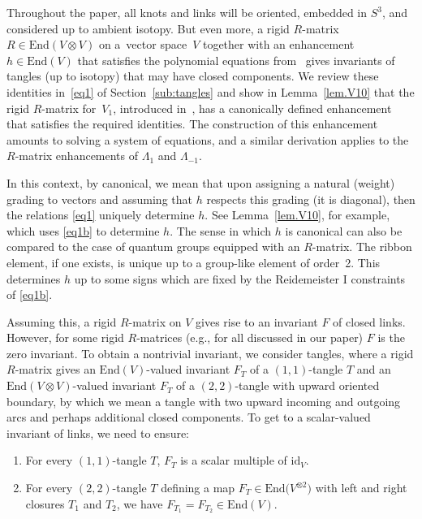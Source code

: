 \documentclass[10pt,a4paper]{amsart}
\makeatletter
\numberwithin{equation}{section}
\theoremstyle{definition}
\def\namedlabel#1#2{\begingroup
 #2%
 \def\@currentlabel{#2}%
 \phantomsection\label{#1}\endgroup
}
\makeatother
\begin{document}
Throughout the paper, all knots and links will be oriented, embedded in $S^3$,
and considered up to ambient isotopy.
But even more, a rigid $R$-matrix $R \in \mathrm{End}(V \otimes V)$ on a~vector space~$V$ together with
an enhancement $h \in \mathrm{End}(V)$ that satisfies the polynomial equations
from~\cite[Theorem~3.7]{Ohtsuki} gives invariants of tangles (up to isotopy)
that may have closed components. We review these identities in~\eqref{eq1} of Section~\ref{sub:tangles} and show in Lemma~\ref{lem.V10} that the rigid $R$-matrix for~$V_1$, introduced in~\cite{GK:multi}, has a canonically defined enhancement that satisfies the
required identities. The construction of this enhancement amounts to solving a system of equations, and a similar derivation applies to the $R$-matrix enhancements of $\Lambda_1$ and $\Lambda_{-1}$.

In this context, by canonical, we mean that upon assigning a natural (weight) grading to vectors and assuming that $h$ respects this grading (it is diagonal), then the relations \eqref{eq1} uniquely determine $h$. See Lemma~\ref{lem.V10}, for example, which uses \eqref{eq1b} to determine $h$. The sense in which $h$ is canonical can also be compared to the case of quantum groups equipped with an $R$-matrix. The ribbon element, if one exists, is unique up to a group-like element of order~2. This determines $h$ up to some signs which are fixed by the Reidemeister I constraints of \eqref{eq1b}.

Assuming this, a rigid $R$-matrix on $V$ gives rise to an invariant $F$ of
closed links. However, for some rigid $R$-matrices (e.g., for all discussed
in our paper) $F$ is the zero invariant.
To obtain a nontrivial invariant, we consider tangles,
where a rigid $R$-matrix gives an $\mathrm{End}(V)$-valued invariant $F_T$ of a
$(1,1)$-tangle $T$ and an $\mathrm{End}(V\otimes V)$-valued invariant $F_T$
of a $(2,2)$-tangle with upward oriented boundary, by which we mean a tangle
with two upward incoming and outgoing arcs and perhaps additional closed components.
To get to a scalar-valued invariant of links, we need to ensure:
\begin{enumerate}\itemsep=0pt
\item[(\namedlabel{item:P1}{$P_1$})]
 For every $(1,1)$-tangle $T$, $F_T$ is a scalar multiple of
 $\mathrm{id}_V$.
\item[(\namedlabel{item:P2}{$P_2$})]
 For every $(2,2)$-tangle $T$ defining a map $F_T\in\mathrm{End}\bigl(V^{\otimes 2}\bigr)$
 with left and right closures $T_1$ and $T_2$, we have
 $F_{T_1}=F_{T_2} \in \mathrm{End}(V)$.
\end{enumerate}
\end{document}
